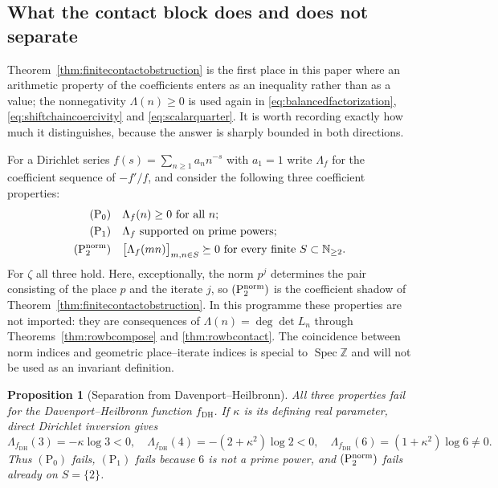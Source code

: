 \documentclass[11pt]{amsart}
\newtheorem{proposition}[theorem]{Proposition}
\theoremstyle{definition}
\theoremstyle{remark}
\newcommand{\N}{\mathbb N}
\newcommand{\Z}{\mathbb Z}
\newcommand{\Spec}{\operatorname{Spec}}
\begin{document}
\subsection{What the contact block does and does not separate}
\label{ss:contactseparation}

Theorem~\ref{thm:finitecontactobstruction} is the first place in this paper
where an arithmetic property of the coefficients enters as an inequality
rather than as a value; the nonnegativity $\Lambda(n)\ge0$ is used again in
\eqref{eq:balancedfactorization}, \eqref{eq:shiftchaincoercivity} and
\eqref{eq:scalarquarter}.  It is worth recording exactly how much it
distinguishes, because the answer is sharply bounded in both directions.

For a Dirichlet series $f(s)=\sum_{n\ge1}a_nn^{-s}$ with $a_1=1$ write
$\Lambda_f$ for the coefficient sequence of $-f'/f$, and consider the
following three coefficient properties:
\begin{align}
 \mathrm{(P_0)}&\quad \Lambda_f(n)\ge0\ \hbox{for all }n;\notag\\
 \mathrm{(P_1)}&\quad \Lambda_f\ \hbox{supported on prime powers};
   \label{eq:coefficienthierarchy}\\
 \mathrm{(P_2^{\rm norm})}&\quad
   \bigl[\Lambda_f(mn)\bigr]_{m,n\in S}\succeq0\ \hbox{for every finite }S
   \subset\N_{\ge2}.\notag
\end{align}
For $\zeta$ all three hold.  Here, exceptionally, the norm $p^j$ determines
the pair consisting of the place $p$ and the iterate $j$, so
$\mathrm{(P_2^{\rm norm})}$ is the coefficient shadow of
Theorem~\ref{thm:finitecontactobstruction}.  In this programme these
properties are not imported: they are consequences of
$\Lambda(n)=\deg\det L_n$ through Theorems~\ref{thm:rowbcompose} and
\ref{thm:rowbcontact}.  The coincidence between norm indices and geometric
place--iterate indices is special to $\Spec\Z$ and will not be used as an
invariant definition.

\begin{proposition}[Separation from Davenport--Heilbronn]
\label{prop:DHseparation}
All three properties fail for the Davenport--Heilbronn function
$f_{\mathrm{DH}}$.  If $\kappa$ is its defining real parameter, direct
Dirichlet inversion gives
\[
 \Lambda_{f_{\mathrm{DH}}}(3)=-\kappa\log3<0,
 \quad
 \Lambda_{f_{\mathrm{DH}}}(4)=-(2+\kappa^2)\log2<0,
 \quad
 \Lambda_{f_{\mathrm{DH}}}(6)=(1+\kappa^2)\log6\ne0.
\]
Thus $\mathrm{(P_0)}$ fails, $\mathrm{(P_1)}$ fails because $6$ is not a
prime power, and $\mathrm{(P_2^{\rm norm})}$ fails already on $S=\{2\}$.
\end{proposition}
\end{document}
